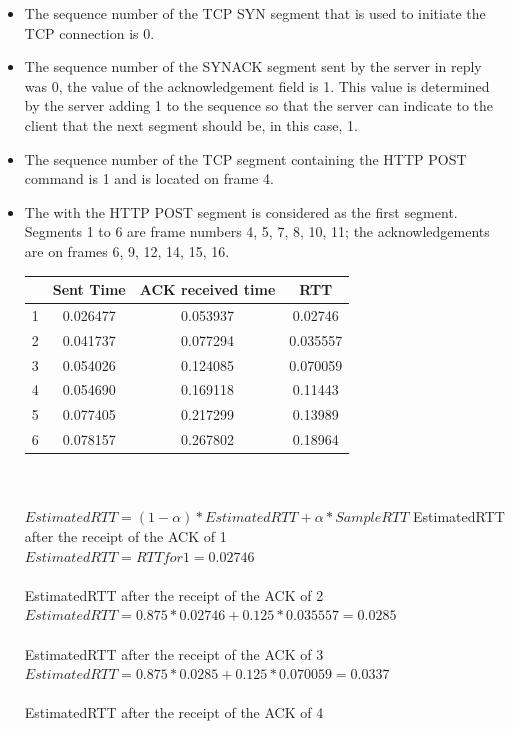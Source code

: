 \documentclass{article}
\begin{document}
\begin{itemize}
  \item The sequence number of the TCP SYN segment that is used to initiate the TCP connection is 0.
  \item The sequence number of the SYNACK segment sent by the server in reply was 0, the value of the acknowledgement field is 1. This value is determined by the server adding 1 to the sequence so that the server can indicate to the client that the next segment should be, in this case, 1.
  \item The sequence number of the TCP segment containing the HTTP POST command is 1 and is located on frame 4.
  \item The with the HTTP POST segment is considered as the first segment. Segments 1 to 6 are frame numbers 4, 5, 7, 8, 10, 11; the acknowledgements are on frames 6, 9, 12, 14, 15, 16.\\
  \begin{tabular}{||c c c c||}
    \hline
     & Sent Time & ACK received time & RTT \\ [0.5ex]
    \hline\hline
    1 & 0.026477 & 0.053937 & 0.02746 \\
    \hline
    2 & 0.041737 & 0.077294 & 0.035557 \\
    \hline
    3 & 0.054026 & 0.124085 & 0.070059 \\
    \hline
    4 & 0.054690 & 0.169118 & 0.11443 \\
    \hline
    5 & 0.077405 & 0.217299 & 0.13989 \\
    \hline
    6 & 0.078157 & 0.267802 & 0.18964\\
    \hline
  \end{tabular}\\\\
  $Estimated RTT = (1 - \alpha) * EstimatedRTT + \alpha * SampleRTT$
  EstimatedRTT after the receipt of the ACK of 1\\
  $Estimated RTT = RTT for 1 = 0.02746$\\\\
  EstimatedRTT after the receipt of the ACK of 2\\
  $Estimated RTT = 0.875 * 0.02746 + 0.125 * 0.035557 = 0.0285$\\\\
  EstimatedRTT after the receipt of the ACK of 3\\
  $Estimated RTT = 0.875 * 0.0285 + 0.125 * 0.070059 = 0.0337$\\\\
  EstimatedRTT after the receipt of the ACK of 4\\

\end{itemize}
\end{document}
